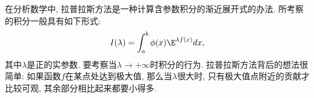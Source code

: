 

在分析数学中, 拉普拉斯方法是一种计算含参数积分的渐近展开式的办法. 所考察的积分一般具有如下形式:
\begin{equation}\label{LapAsm_eq1}
I(\lambda)=\int_a^b \phi(x)\E^{\lambda f(x)}dx,
\end{equation}
其中$\lambda$是正的实参数. 要考察当$\lambda\to+\infty$时积分的行为. 拉普拉斯方法背后的想法很简单: 如果函数$f$在某点处达到极大值, 那么当$\lambda$很大时, 只有极大值点附近的贡献才比较可观, 其余部分相比起来都要小得多.

